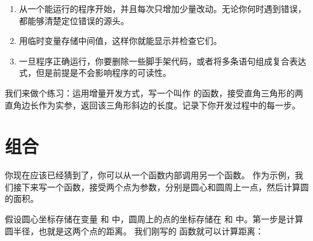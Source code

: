 \begin{enumerate}
\item 从一个能运行的程序开始，并且每次只增加少量改动。无论你何时遇到错误，都能够清楚定位错误的源头。

\item 用临时变量存储中间值，这样你就能显示并检查它们。

\item 一旦程序正确运行，你要删除一些脚手架代码，或者将多条语句组成复合表达式，但是前提是不会影响程序的可读性。
\end{enumerate}


我们来做个练习：运用增量开发方式，写一个叫作  的函数，接受直角三角形的两直角边长作为实参，返回该三角形斜边的长度。记录下你开发过程中的每一步。



\section{组合}
  


你现在应该已经猜到了，你可以从一个函数内部调用另一个函数。
作为示例，我们接下来写一个函数，接受两个点为参数，分别是圆心和圆周上一点，然后计算圆的面积。


假设圆心坐标存储在变量  和  中，圆周上的点的坐标存储在  和  中。第一步是计算圆半径，也就是这两个点的距离。
我们刚写的  函数就可以计算距离：

